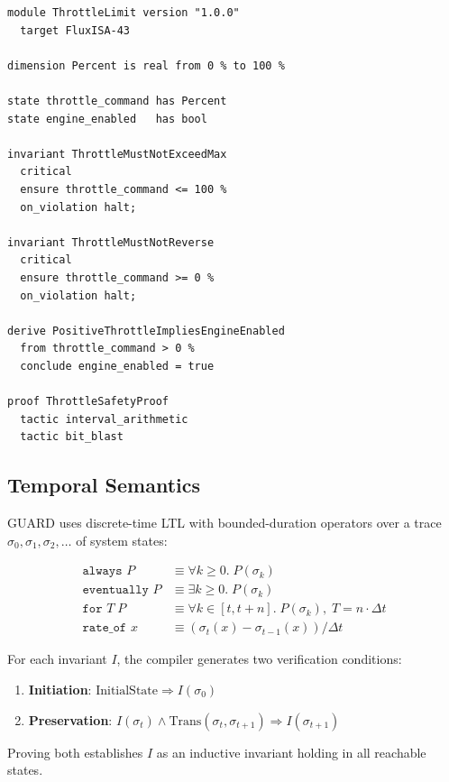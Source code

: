 \documentclass[sigplan,10pt,review]{acmart}
\begin{document}
\begin{lstlisting}[style=guardcode,caption={GUARD module structure for a throttle controller.},label={lst:guard}]
module ThrottleLimit version "1.0.0"
  target FluxISA-43

dimension Percent is real from 0 % to 100 %

state throttle_command has Percent
state engine_enabled   has bool

invariant ThrottleMustNotExceedMax
  critical
  ensure throttle_command <= 100 %
  on_violation halt;

invariant ThrottleMustNotReverse
  critical
  ensure throttle_command >= 0 %
  on_violation halt;

derive PositiveThrottleImpliesEngineEnabled
  from throttle_command > 0 %
  conclude engine_enabled = true

proof ThrottleSafetyProof
  tactic interval_arithmetic
  tactic bit_blast
\end{lstlisting}

\subsection{Temporal Semantics}

GUARD uses discrete-time LTL with bounded-duration operators over a trace
$\sigma_0, \sigma_1, \sigma_2, \ldots$ of system states:

\begin{align*}
  \texttt{always } P &\equiv \forall k \geq 0.\; P(\sigma_k) \\
  \texttt{eventually } P &\equiv \exists k \geq 0.\; P(\sigma_k) \\
  \texttt{for } T\; P &\equiv \forall k \in [t, t{+}n].\; P(\sigma_k),\; T = n \cdot \Delta t \\
  \texttt{rate\_of } x &\equiv (\sigma_t(x) - \sigma_{t-1}(x)) / \Delta t
\end{align*}

For each invariant $I$, the compiler generates two verification conditions:
\begin{enumerate}
  \item \textbf{Initiation}: $\text{InitialState} \Rightarrow I(\sigma_0)$
  \item \textbf{Preservation}: $I(\sigma_t) \wedge \text{Trans}(\sigma_t, \sigma_{t+1}) \Rightarrow I(\sigma_{t+1})$
\end{enumerate}
Proving both establishes $I$ as an inductive invariant holding in all reachable states.
\end{document}
